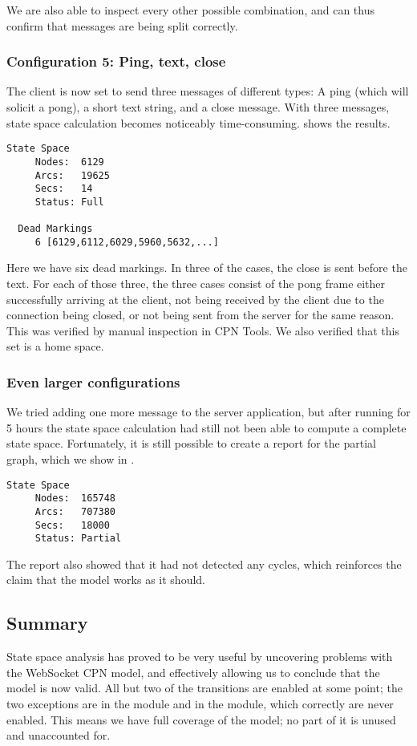 	We are also able to inspect every other possible combination, and can thus
	confirm that messages are being split correctly.

	\subsubsection{Configuration 5: Ping, text, close}
	The client is now set to send three messages of different types: A ping
	(which will solicit a pong), a short text string, and a	close message. With
	three messages, state space calculation becomes noticeably time-consuming.
	 shows the results.
	
	\begin{lstlisting}[language={},float,label=lst:ssa_ping_text_close,caption=Ping
	Text Close]
  State Space
     Nodes:  6129
     Arcs:   19625
     Secs:   14
     Status: Full
     
  Dead Markings
     6 [6129,6112,6029,5960,5632,...]
	\end{lstlisting}
	
	Here we have six dead markings. In three of the cases, the close is sent before
	the text. For each of those three, the three cases consist of the pong frame
	either successfully arriving at the client, not being received by the client due
	to the connection being closed, or not being sent from the server for the same
	reason. This was verified by manual inspection in CPN Tools. We also verified
	that this set is a home space.

	\subsubsection{Even larger configurations}
	We tried adding one more message to the server application, but after running for
	5 hours the state space calculation had still not been able to compute a
	complete state space. Fortunately, it is still possible to create a report for
	the partial graph, which we show in . 
	
	\begin{lstlisting}[language={},float,label=lst:ssa_large,caption=Large
	configuration]
  State Space
     Nodes:  165748
     Arcs:   707380
     Secs:   18000
     Status: Partial
	\end{lstlisting}
	The report also showed that it had not detected any cycles, which reinforces
	the claim that the model works as it should.
	
	\subsection{Summary}
	State space analysis has proved to be very useful by uncovering problems
	with the WebSocket CPN model, and effectively allowing us to conclude that the
	model is now valid.  All but two of the transitions are enabled at some point;
	the two exceptions are  in the 
	module and  in the  module,
	which correctly are never enabled.
	This means we have full coverage of the model; no part of it is unused and
	unaccounted for.
